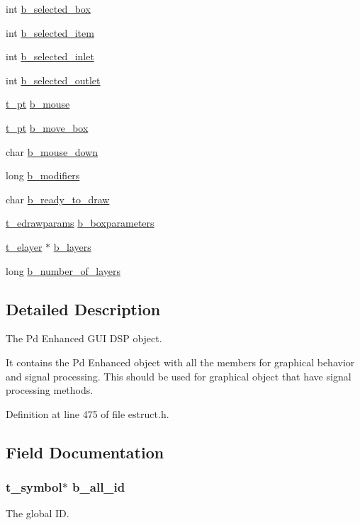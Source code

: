 \begin{DoxyCompactItemize}
\item 
int \hyperlink{struct__edspbox_acc1a127070b19ccf6e222d7349c84c96}{b\-\_\-selected\-\_\-box}
\item 
int \hyperlink{struct__edspbox_a1f65b6d093e53fd85bed085ce0c5dd8e}{b\-\_\-selected\-\_\-item}
\item 
int \hyperlink{struct__edspbox_a0cebb4789c213079e0490e86c10c2893}{b\-\_\-selected\-\_\-inlet}
\item 
int \hyperlink{struct__edspbox_acbf0482cb9c6e192e2059775acc1ac86}{b\-\_\-selected\-\_\-outlet}
\item 
\hyperlink{struct__pt}{t\-\_\-pt} \hyperlink{struct__edspbox_a8831d355ec1dbb2dca9a68268a977965}{b\-\_\-mouse}
\item 
\hyperlink{struct__pt}{t\-\_\-pt} \hyperlink{struct__edspbox_a2b028829ae54f8ccede6bb0d5903f7fd}{b\-\_\-move\-\_\-box}
\item 
char \hyperlink{struct__edspbox_a1dc439a4d35e98f78370c81ceadc8ea0}{b\-\_\-mouse\-\_\-down}
\item 
long \hyperlink{struct__edspbox_ad230697acdd2d00abb2dc18dd38089d8}{b\-\_\-modifiers}
\item 
char \hyperlink{struct__edspbox_a234ea03e103bd45f5fa1d27b8e69b5dd}{b\-\_\-ready\-\_\-to\-\_\-draw}
\item 
\hyperlink{struct__edrawparams}{t\-\_\-edrawparams} \hyperlink{struct__edspbox_a01fa53a36dc717c81755d805a868ad9d}{b\-\_\-boxparameters}
\item 
\hyperlink{struct__elayer}{t\-\_\-elayer} $\ast$ \hyperlink{struct__edspbox_ad80949f483467d74761a9e321300d64e}{b\-\_\-layers}
\item 
long \hyperlink{struct__edspbox_a84105957ca11a224cf734f350fb23ac9}{b\-\_\-number\-\_\-of\-\_\-layers}
\end{DoxyCompactItemize}


\subsection{Detailed Description}
The Pd Enhanced G\-U\-I D\-S\-P object. 

It contains the Pd Enhanced object with all the members for graphical behavior and signal processing. This should be used for graphical object that have signal processing methods. 

Definition at line 475 of file estruct.\-h.



\subsection{Field Documentation}
\hypertarget{struct__edspbox_a0f63dcf604135dd4fbfbf43eaed53c1a}{
\subsubsection[{b\-\_\-all\-\_\-id}]{\setlength{\rightskip}{0pt plus 5cm}t\-\_\-symbol$\ast$ b\-\_\-all\-\_\-id}}\label{struct__edspbox_a0f63dcf604135dd4fbfbf43eaed53c1a}
The global I\-D. 

